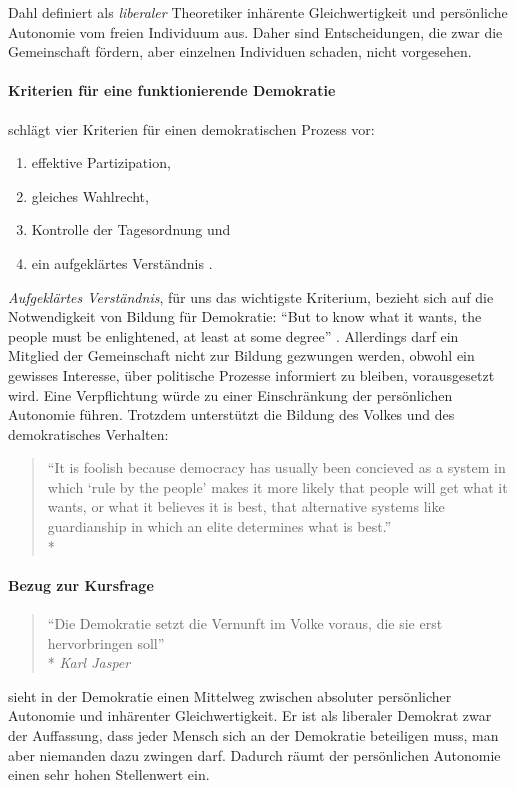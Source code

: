 Dahl definiert als \emph{liberaler} Theoretiker inhärente Gleichwertigkeit und persönliche Autonomie vom freien Individuum aus.
Daher sind Entscheidungen, die zwar die Gemeinschaft fördern, aber einzelnen Individuen schaden, nicht vorgesehen.


\paragraph{Kriterien für eine funktionierende Demokratie}

\citeauthor{Dahl-1989-aa} schlägt vier Kriterien für einen demokratischen Prozess vor:

\begin{enumerate}
	\item effektive Partizipation,
	\item gleiches Wahlrecht,
	\item Kontrolle der Tagesordnung und
	\item ein aufgeklärtes Verständnis \parencite[vgl.][100]{Dahl-1989-aa}.
\end{enumerate}

\emph{Aufgeklärtes Verständnis}, für uns das wichtigste Kriterium, bezieht sich auf die Notwendigkeit von Bildung für Demokratie:
``But to know what it wants, the people must be enlightened, at least at some degree'' \parencite[100]{Dahl-1989-aa}.
Allerdings darf ein Mitglied der Gemeinschaft nicht zur Bildung gezwungen werden, obwohl ein gewisses Interesse, über politische Prozesse informiert zu bleiben, vorausgesetzt wird.
Eine Verpflichtung würde zu einer Einschränkung der persönlichen Autonomie führen.
Trotzdem unterstützt \citeauthor{Dahl-1989-aa} die Bildung des Volkes und des demokratisches Verhalten:

\begin{quote}
	``It is foolish because democracy has usually been concieved as a system in which `rule by the people' makes it more likely that people will get what it wants, or what it believes it is best, that alternative systems like guardianship in which an elite determines what is best.''\\*
	\parencite[111]{Dahl-1989-aa}
\end{quote}


\paragraph{Bezug zur Kursfrage}

\begin{quote}
	``Die Demokratie setzt die Vernunft im Volke voraus, die sie erst hervorbringen soll''\\*
	\emph{Karl Jasper}
\end{quote}

\citeauthor{Dahl-1989-aa} sieht in der Demokratie einen Mittelweg zwischen absoluter persönlicher Autonomie und inhärenter Gleichwertigkeit.
Er ist als liberaler Demokrat zwar der Auffassung, dass jeder Mensch sich an der Demokratie beteiligen muss, man aber niemanden dazu zwingen darf.
Dadurch räumt \citeauthor{Dahl-1989-aa} der persönlichen Autonomie einen sehr hohen Stellenwert ein.